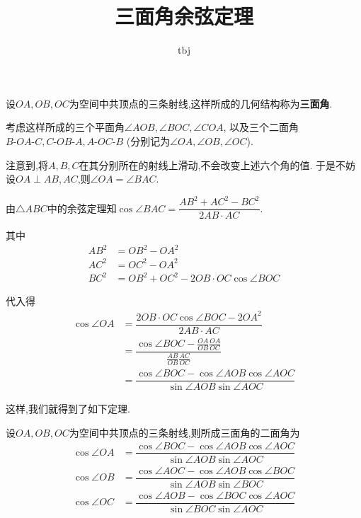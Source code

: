 \documentclass{article}
\title{三面角余弦定理}
\author{tbj}
\date{}
\begin{document}
\maketitle

设$OA, OB, OC$为空间中共顶点的三条射线,这样所成的几何结构称为\textbf{三面角}.

考虑这样所成的三个平面角$\angle AOB, \angle BOC, \angle COA$,
以及三个二面角$B \mbox{-} OA \mbox{-} C, C \mbox{-} OB \mbox{-} A, A \mbox{-} OC \mbox{-} B$
(分别记为$\angle OA, \angle OB, \angle OC$).

注意到,将$A, B, C$在其分别所在的射线上滑动,不会改变上述六个角的值.
于是不妨设$OA \perp AB, AC$,则$\angle OA = \angle BAC$.

由$\triangle ABC$中的余弦定理知$\cos \angle BAC = \dfrac{AB^2 + AC^2 - BC^2}{2AB \cdot AC}$.

其中
\begin{align*}
    AB^2 & = OB^2 - OA^2 \\
    AC^2 & = OC^2 - OA^2 \\
    BC^2 & = OB^2 + OC^2 - 2 OB \cdot OC \cos \angle BOC
\end{align*}

代入得
\begin{align*}
    \cos \angle OA & = \dfrac{2OB \cdot OC \cos \angle BOC - 2OA^2}{2AB \cdot AC} \\
    & = \dfrac{\cos \angle BOC - \frac{OA}{OB} \frac{OA}{OC}}{\frac{AB}{OB} \frac{AC}{OC}} \\
    & = \dfrac{\cos \angle BOC - \cos \angle AOB \cos \angle AOC}{\sin \angle AOB \sin \angle AOC}
\end{align*}

这样,我们就得到了如下定理.

\begin{thm}[三面角第一余弦定理]
    设$OA, OB, OC$为空间中共顶点的三条射线,则所成三面角的二面角为
    \begin{align}
        \cos \angle OA & = \dfrac{\cos \angle BOC - \cos \angle AOB \cos \angle AOC}{\sin \angle AOB \sin \angle AOC} \label{1} \\
        \cos \angle OB & = \dfrac{\cos \angle AOC - \cos \angle AOB \cos \angle BOC}{\sin \angle AOB \sin \angle BOC} \label{2} \\
        \cos \angle OC & = \dfrac{\cos \angle AOB - \cos \angle BOC \cos \angle AOC}{\sin \angle BOC \sin \angle AOC} \label{3}
    \end{align}
\end{thm}
\end{document}
